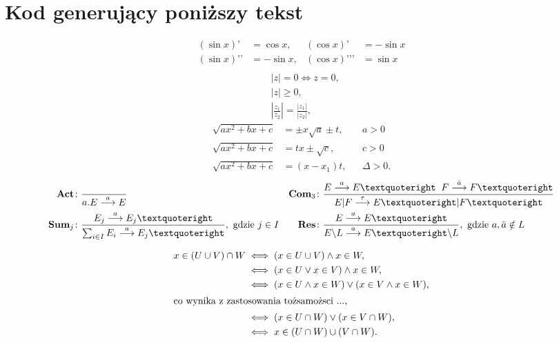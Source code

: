 \documentclass[a4paper,12pt]{article}
\begin{document}
	\section{Kod generujący poniższy tekst}
\begin{align}
		(\sin x)’ & = \cos x, & (\cos x)’ & = -\sin x\\
		(\sin x)’’ & = -\sin x, & (\cos x)’’’ & = \sin x \\
\end{align}
	\begin{align}
		& \left|z\right| = 0 \iff z = 0,\label{eq:comp1}\\
		& \left|z\right| \geqslant 0,\label{eq:comp2}\\
		& \left|\frac{z_1}{z_2}\right| =
		\frac{\left|z_1\right|}{\left|z_2\right|},\label{eq:comp3}
	\end{align}
	\begin{align*}
		\sqrt{ax^2 + bx + c} &= \pm x \sqrt{a} \pm t, && a > 0\\
		\sqrt{ax^2 + bx + c} &= tx \pm \sqrt{c}, && c > 0\\
		\sqrt{ax^2 + bx + c} &= (x-x_1)t, && \Delta > 0.
	\end{align*}
	\begin{align*}
		\text{\bf Act}\colon &
		\frac{}{a.E \stackrel{a}{\longrightarrow} E} &
		\text{\bf Com}_3\colon &
		\frac{E \stackrel{a}{\longrightarrow} E’ \;\;
			F \stackrel{\bar{a}}{\longrightarrow} F’}
		{E|F \stackrel{\tau}{\longrightarrow} E’|F’}
		\\
		\text{\bf Sum}_{j}\colon &
		\frac{E_j \stackrel{a}{\longrightarrow} E_j’}
		{\sum_{i\in I} E_i \stackrel{a}{\longrightarrow} E_j’},
		\text{ gdzie }j \in I &
		\text{\bf Res}\colon &
		\frac{E \stackrel{a}{\longrightarrow} E’}
		{E\backslash L \stackrel{a}{\longrightarrow} E’\backslash L},
		\text{ gdzie }a,\bar{a}\notin L
	\end{align*}
	
	\begin{align*}
		x \in (U \cup V) \cap W
		& \iff (x \in U \cup V) \land x \in W,\\
		& \iff (x \in U \lor x \in V) \land x \in W,\\
		& \iff (x \in U \land x \in W) \lor (x \in V \land x \in W),\\
		\intertext{co wynika z zastosowania tożsamożsci ...,}
		& \iff (x \in U \cap W) \lor (x \in V \cap W),\\
		& \iff x \in (U \cap W) \cup (V \cap W).
	\end{align*}
	
\end{document}
